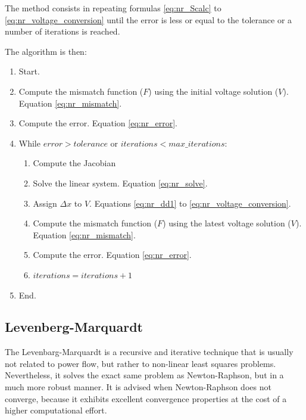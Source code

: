 \documentclass[nols,a4paper,twoside,notoc,fleqn]{tufte-book}
\begin{document}
The method consists in repeating formulas \ref{eq:nr_Scalc} to \ref{eq:nr_voltage_conversion} until the error is less or equal to the tolerance or a number of iterations is reached.

The algorithm is then:

\begin{enumerate}

\item Start.

\item Compute the mismatch function ($F$) using the initial voltage solution ($V$). Equation \ref{eq:nr_mismatch}.

\item Compute the error. Equation \ref{eq:nr_error}.

\item While $error > tolerance$ or $iterations < max\_iterations$:

	\begin{enumerate}
	\item Compute the Jacobian
	
	\item Solve the linear system. Equation \ref{eq:nr_solve}.
	
	\item Assign $\Delta x$ to $V$. Equations \ref{eq:nr_dd1} to \ref{eq:nr_voltage_conversion}.
	
	\item Compute the mismatch function ($F$) using the latest voltage solution ($V$). Equation \ref{eq:nr_mismatch}.
	
	\item Compute the error. Equation \ref{eq:nr_error}.
	
	\item $iterations = iterations + 1$
	\end{enumerate}

\item End.
\end{enumerate}



\newpage
\subsection{Levenberg-Marquardt} \label{LM-Method}

The Levenbarg-Marquardt is a recursive and iterative technique that is usually not related to power flow, but rather to non-linear least squares problems. Nevertheless, it solves the exact same problem as Newton-Raphson, but in a much more robust manner. It is advised when Newton-Raphson does not converge, because it exhibits excellent convergence properties at the cost of a higher computational effort.
\end{document}
